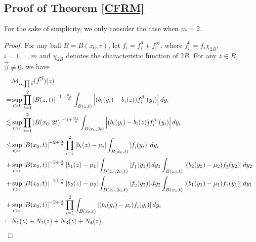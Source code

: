 \documentclass[11pt, twoside, leqno]{article}
\begin{document}
\subsection{Proof of Theorem \ref{CFRM}}
For the sake of simplicity, we only consider the case when $m=2$.
\begin{proof}[Proof]
	For any ball $B=B(x_0,r)$, let $f_i=f^0_i+f^{\infty}_i$, where $f^0_i=f_i\chi_{2B}$, $i=1,\ldots,m$ and $\chi_{2B}$ denotes the characteristic function of $2B$. For any $z\in B$, $\vec \beta \ne 0$, we have 
	\begin{align}
	&{\mathcal{M}_{\alpha ,\prod {\vec b} }}({{\vec f}^{\vec \beta }})(z)\notag\\
	=& \mathop {\sup }\limits_{t > 0} \prod\limits_{i = 1}^2 {{{\left| {B(z,t)} \right|}^{ - 1 + \frac{\alpha_i }{{n}}}}\int_{B(z,t)} {\left| {({b_i}({y_i}) - {b_i}(z))f_i^{{\beta _i}}({y_i})} \right|d{y_i}} }\notag\\
	\lesssim&\mathop {\sup }\limits_{t > r} \prod\limits_{i = 1}^2 {{{\left| {B({x_0},2t)} \right|}^{ - 1 + \frac{\alpha_i }{{n}}}}\int_{B({x_0},2t)} {\left| {({b_i}({y_i}) - {b_i}(z))f_i^{{\beta _i}}({y_i})} \right|d{y_i}} }\notag\\
	\le&\mathop {\sup }\limits_{t > r} {\left| {B({x_0},t)} \right|^{ - 2 + \frac{\alpha }{n}}}\prod\limits_{i = 1}^2 {\left| {{b_i}(z) - {\mu _i}} \right|\int_{B({x_0},t)} {\left| {f_i^{}({y_i})} \right|d{y_i}} } \notag\\
	+&\mathop {\sup }\limits_{t > r} {\left| {B({x_0},t)} \right|^{ - 2 + \frac{\alpha }{n}}}\left| {{b_1}(z) - {\mu _1}} \right|\int_{D({x_0},2{c_0}t)} {\left| {f_1^{}({y_1})} \right|d{y_1}} \int_{B({x_0},t)} {\left| {({b_2}({y_2}) - {\mu _2})f_2^{}({y_2})} \right|d{y_2}}\notag\\
	+&\mathop {\sup }\limits_{t > r} {\left| {B({x_0},t)} \right|^{ - 2 + \frac{\alpha }{n}}}\left| {{b_2}(z) - {\mu _2}} \right|\int_{D({x_0},2{c_0}t)} {\left| {f_2^{}({y_2})} \right|d{y_2}} \int_{B({x_0},t)} {\left| {({b_1}({y_1}) - {\mu _1})f_1^{}({y_1})} \right|d{y_1}}\notag\\
	+&\mathop {\sup }\limits_{t > r} {\left| {B({x_0},t)} \right|^{ - 2 + \frac{\alpha }{n}}}\prod\limits_{i = 1}^2 {\int_{B({x_0},t)} {\left| {({b_i}({y_i}) - {\mu _i})f_i^{}({y_i})} \right|d{y_i}} }\notag\\
	:=&{N_1}(z) + {N_2}(z) + {N_3}(z) + {N_4}(z).
	\end{align}
	

\end{proof}
\end{document}
